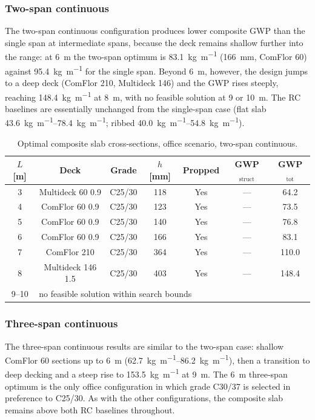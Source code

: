 \subsubsection*{Two-span continuous}
The two-span continuous configuration produces lower composite GWP than the single span at intermediate spans, because the deck remains shallow further into the range: at \SI{6}{\meter} the two-span optimum is \SI{83.1}{\kilo\gram\per\meter} (\SI{166}{mm}, ComFlor 60) against \SI{95.4}{\kilo\gram\per\meter} for the single span. Beyond \SI{6}{\meter}, however, the design jumps to a deep deck (ComFlor 210, Multideck 146) and the GWP rises steeply, reaching \SI{148.4}{\kilo\gram\per\meter} at \SI{8}{\meter}, with no feasible solution at \SI{9}{} or \SI{10}{\meter}. The RC baselines are essentially unchanged from the single-span case (flat slab \SIrange{43.6}{78.4}{\kilo\gram\per\meter}; ribbed \SIrange{40.0}{54.8}{\kilo\gram\per\meter}).

\begin{table}[h!]
\small\centering
\caption{Optimal composite slab cross-sections, office scenario, two-span continuous.}
\label{tab:office_2span}
\begin{tabular}{ccccccc}
\toprule
$L$ [m] & Deck & Grade & $h$ [mm] & Propped & GWP$_\mathrm{struct}$ & GWP$_\mathrm{tot}$ \\
\midrule
3 & Multideck 60 0.9 & C25/30 & 118 & Yes & --- & 64.2 \\
4 & ComFlor 60 0.9   & C25/30 & 123 & Yes & --- & 73.5 \\
5 & ComFlor 60 0.9   & C25/30 & 140 & Yes & --- & 76.8 \\
6 & ComFlor 60 0.9   & C25/30 & 166 & Yes & --- & 83.1 \\
7 & ComFlor 210      & C25/30 & 364 & Yes & --- & 110.0 \\
8 & Multideck 146 1.5 & C25/30 & 403 & Yes & --- & 148.4 \\
9--10 & \multicolumn{6}{l}{no feasible solution within search bounds} \\
\bottomrule
\end{tabular}
\end{table}

\subsubsection*{Three-span continuous}
The three-span continuous results are similar to the two-span case: shallow ComFlor 60 sections up to \SI{6}{\meter} (\SIrange{62.7}{86.2}{\kilo\gram\per\meter}), then a transition to deep decking and a steep rise to \SI{153.5}{\kilo\gram\per\meter} at \SI{9}{\meter}. The \SI{6}{\meter} three-span optimum is the only office configuration in which grade C30/37 is selected in preference to C25/30. As with the other configurations, the composite slab remains above both RC baselines throughout.


